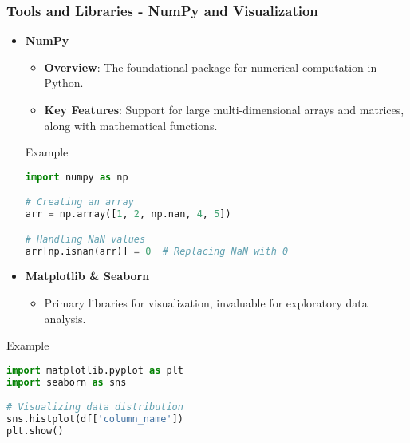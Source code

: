 \documentclass[aspectratio=169]{beamer}
\begin{document}
\begin{frame}[fragile]
    \frametitle{Tools and Libraries - NumPy and Visualization}
    \begin{itemize}
        \item \textbf{NumPy}
        \begin{itemize}
            \item \textbf{Overview}: The foundational package for numerical computation in Python.
            \item \textbf{Key Features}: Support for large multi-dimensional arrays and matrices, along with mathematical functions.
        \end{itemize}
        
        \begin{block}{Example}
        \begin{lstlisting}[language=Python]
import numpy as np

# Creating an array
arr = np.array([1, 2, np.nan, 4, 5])

# Handling NaN values
arr[np.isnan(arr)] = 0  # Replacing NaN with 0
        \end{lstlisting}
        \end{block}
        
        \item \textbf{Matplotlib \& Seaborn}
        \begin{itemize}
            \item Primary libraries for visualization, invaluable for exploratory data analysis.
        \end{itemize}
    \end{itemize}
    
    \begin{block}{Example}
        \begin{lstlisting}[language=Python]
import matplotlib.pyplot as plt
import seaborn as sns

# Visualizing data distribution
sns.histplot(df['column_name'])
plt.show()
        \end{lstlisting}
    \end{block}
\end{frame}
\end{document}

